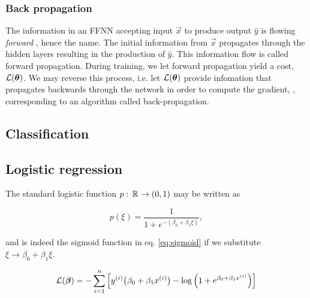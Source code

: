     





    \subsubsection{Back propagation}\label{sec:back_propagation}


    The information in an FFNN accepting input $\vec{x}$ to produce output $\hat{y}$  is flowing \textit{forward} \citep{Goodfellow2016}, hence the name. The initial information from $\vec{x}$ propagates through the hidden layers resulting in the production of $\hat{y}$. This information flow is called forward propagation. During training, we let forward propagation yield a cost, $\mathcal{L}(\boldsymbol{\theta})$. We may reverse this process, i.e. let $\mathcal{L}(\boldsymbol{\theta})$ provide infomation that propagates backwards through the network in order to compute the gradient, , corresponding to an algorithm called back-propagation.


\subsection{Classification}\label{sec:classification}

\subsection{Logistic regression}\label{sec:logistic_regression}

The standard logistic function $p:\, \mathbb{R}^{} \to (0,1)$ may be written as 

\begin{equation}\label{eq:logistic_function}
    p(\xi) = \frac{1}{1+e^{-(\beta_0 + \beta_1\xi)}},
\end{equation}

and is indeed the sigmoid function in eq. \eqref{eq:sigmoid} if we substitute $\xi \to \beta_0 + \beta_1 \xi$. 
\fillertext

\begin{equation}\label{eq:logistic_cost_function}
    \mathcal{L}(\boldsymbol{\beta}) = - \sum_{i=1}^n \Big[ y^{(i)} \big(\beta_0+ \beta_1 x^{(i)}\big) - \log{\Big(1+e^{\beta_0 + \beta_1 x^{(i)}}\Big)} \Big]
\end{equation}